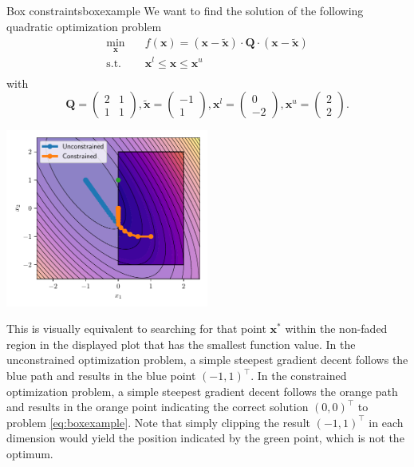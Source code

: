 \begin{example}{Box constraints}{boxexample}
    We want to find the solution of the following quadratic optimization problem
    \begin{equation}
        \begin{aligned}
            \min_{\mathbf{x}} \quad & f(\mathbf{x})= (\mathbf{x}-\tilde{\mathbf{x}}) \cdot \mathbf{Q} \cdot (\mathbf{x}-\tilde{\mathbf{x}})\\
            \textrm{s.t.} \quad     & \mathbf{x}^l \le \mathbf{x} \le \mathbf{x}^u\\
        \end{aligned}
        \label{eq:boxexample}
    \end{equation}
    with 
    \begin{equation}
        \mathbf{Q} = 
        \begin{pmatrix}
        2 & 1 \\
        1 & 1 
        \end{pmatrix}
        ,
        \tilde{\mathbf{x}} = 
        \begin{pmatrix}
        -1\\
        1 
        \end{pmatrix}
        ,
        \mathbf{x}^l = 
        \begin{pmatrix}
        0\\
        -2 
        \end{pmatrix}
        ,
        \mathbf{x}^u = 
        \begin{pmatrix}
        2\\
        2 
        \end{pmatrix}
        .
    \end{equation}

    \begin{center}
        \includegraphics[width=0.5\textwidth]{figures/box_example.pdf}
    \end{center}

    This is visually equivalent to searching for that point $\mathbf{x}^*$ within the non-faded region in the displayed plot that has the smallest function value. In the unconstrained optimization problem, a simple steepest gradient decent follows the blue path and results in the blue point $(-1, 1)^\top$. In the constrained optimization problem, a simple steepest gradient decent follows the orange path and results in the orange point indicating the correct solution $(0, 0)^\top$ to problem \eqref{eq:boxexample}. Note that simply clipping the result $(-1, 1)^\top$ in each dimension would yield the position indicated by the green point, which is not the optimum.    
\end{example}
